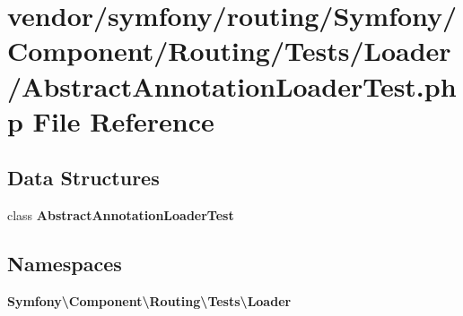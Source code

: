 \section{vendor/symfony/routing/\+Symfony/\+Component/\+Routing/\+Tests/\+Loader/\+Abstract\+Annotation\+Loader\+Test.php File Reference}
\label{_abstract_annotation_loader_test_8php}
\subsection*{Data Structures}
\begin{DoxyCompactItemize}
\item 
class {\bf Abstract\+Annotation\+Loader\+Test}
\end{DoxyCompactItemize}
\subsection*{Namespaces}
\begin{DoxyCompactItemize}
\item 
 {\bf Symfony\textbackslash{}\+Component\textbackslash{}\+Routing\textbackslash{}\+Tests\textbackslash{}\+Loader}
\end{DoxyCompactItemize}
